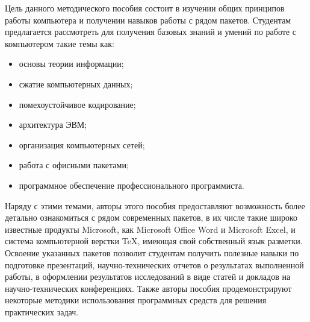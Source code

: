 

Цель данного методического пособия состоит в изучении общих принципов работы компьютера и получении навыков работы с рядом пакетов. Студентам предлагается рассмотреть для получения базовых знаний и умений по работе с компьютером такие темы как:
\begin{itemize}
    \item основы теории информации;
    \item сжатие компьютерных данных;
    \item помехоустойчивое кодирование;
    \item архитектура ЭВМ;
    \item организация компьютерных сетей;
    \item работа с офисными пакетами;
    \item программное обеспечение профессионального программиста.
\end{itemize}

Наряду с этими темами, авторы этого пособия предоставляют возможность более детально ознакомиться с рядом современных пакетов, в их числе такие широко известные продукты Microsoft, как Microsoft Office Word и Microsoft Excel, и система компьютерной верстки \TeX, имеющая свой собственный язык разметки. Освоение указанных пакетов позволит студентам получить полезные навыки по подготовке презентаций, научно-технических отчетов о результатах выполненной работы, в оформлении результатов исследований в виде статей и докладов на научно-технических конференциях. Также авторы пособия продемонстрируют некоторые методики использования программных средств для решения практических задач.
